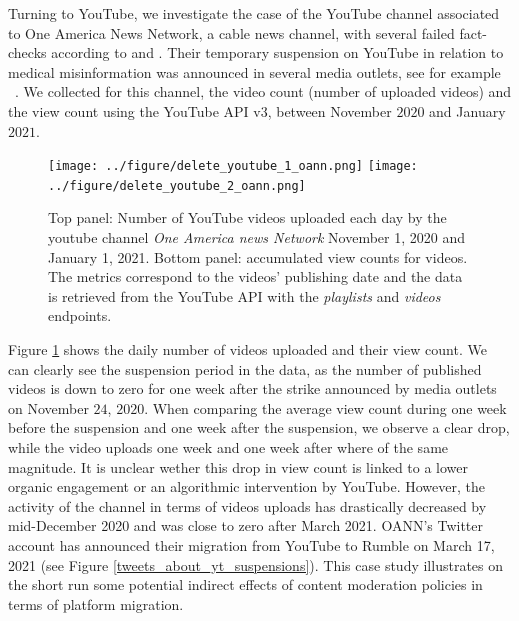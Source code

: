 \documentclass[Afour,sageh,times]{sagej}
\begin{document}
Turning to YouTube, we investigate the case of the YouTube channel associated to  One America News Network, a cable news channel, with several failed fact-checks according to \cite{MBFCoann} and \cite{openfeedbackoann}. 
Their temporary suspension on YouTube in relation to medical misinformation was announced in several media outlets, see for example ~\cite{nbcnews}. 
We collected for this channel, the video count (number of uploaded videos) and the view count using the YouTube API v3, between November $2020$ and January $2021$.

\begin{figure}[h]
\hspace{-2em}
		\texttt{[image: ../figure/delete\_youtube\_1\_oann.png]} \hspace{4em}
		\texttt{[image: ../figure/delete\_youtube\_2\_oann.png]} 
	\caption{Top panel: Number of YouTube videos uploaded each day by the youtube channel {\it One America news Network} November 1, 2020 and January 1, 2021. Bottom panel: accumulated view counts for videos. The metrics correspond to the videos’  publishing date and the data is retrieved from the YouTube API with the {\it playlists} and  {\it videos} endpoints. }
	\label{delete_youtube_oann}
\end{figure}

\smallskip

Figure \ref{delete_youtube_oann} shows the daily number of videos uploaded and their view count. 
We can clearly see the suspension period in the data, as the number of published videos is down to zero for one week after the strike announced by media outlets on November $24$, $2020$. 
When comparing the average view count during one week before the suspension and one week after the suspension, we observe a clear drop, while the video uploads one week and one week after where of the same magnitude.
It is unclear wether this drop in view count is linked to a lower organic engagement or an algorithmic intervention by YouTube.
However, the activity of the channel in terms of videos uploads has drastically decreased by mid-December 2020 and was close to zero after March 2021. OANN's Twitter account has announced their migration from YouTube to Rumble on March 17, 2021 (see Figure \ref{tweets_about_yt_suspensions}). 
This case study illustrates on the short run some potential indirect effects of content moderation policies in terms of platform migration. 
\end{document}
